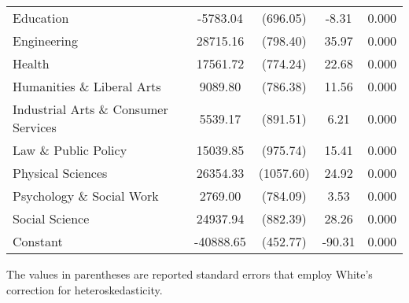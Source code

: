 \documentclass[11pt]{article}
\theoremstyle{definition}
\begin{document}
{\begin{center}
\begin{tabular}{l c c c c}
Education & -5783.04 & (696.05) & -8.31 & 0.000  \\
Engineering & 28715.16 & (798.40) & 35.97 & 0.000 \\
Health & 17561.72 & (774.24) & 22.68 & 0.000 \\
Humanities \& Liberal Arts & 9089.80 & (786.38) & 11.56 & 0.000 \\
Industrial Arts \& Consumer Services & 5539.17 & (891.51) & 6.21 & 0.000 \\
Law \& Public Policy & 15039.85 & (975.74) & 15.41 & 0.000 \\
Physical Sciences & 26354.33 & (1057.60) & 24.92 & 0.000 \\
Psychology \& Social Work & 2769.00 & (784.09) & 3.53 & 0.000 \\
Social Science & 24937.94 & (882.39) & 28.26 & 0.000 \\
Constant & -40888.65 & (452.77) & -90.31 & 0.000 \\
\hline\hline
\end{tabular} 
\end{center}} 
\hspace{12mm} \small{The values in parentheses are reported standard errors that employ White's correction for heteroskedasticity.} 
\end{document}
